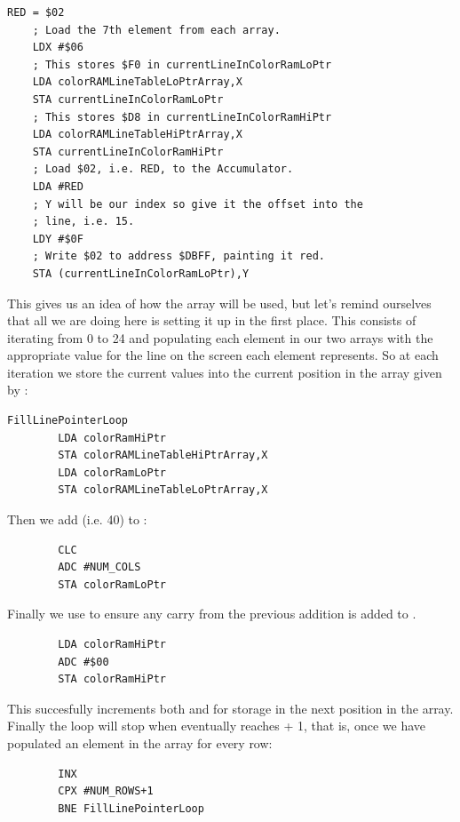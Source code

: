\begin{lstlisting}[basicstyle=\ttfamily\scriptsize]
    RED = $02
    ; Load the 7th element from each array.
    LDX #$06
    ; This stores $F0 in currentLineInColorRamLoPtr
    LDA colorRAMLineTableLoPtrArray,X
    STA currentLineInColorRamLoPtr
    ; This stores $D8 in currentLineInColorRamHiPtr
    LDA colorRAMLineTableHiPtrArray,X
    STA currentLineInColorRamHiPtr
    ; Load $02, i.e. RED, to the Accumulator. 
    LDA #RED
    ; Y will be our index so give it the offset into the
    ; line, i.e. 15. 
    LDY #$0F
    ; Write $02 to address $DBFF, painting it red.
    STA (currentLineInColorRamLoPtr),Y
\end{lstlisting}

This gives us an idea of how the array will be used, but let's remind ourselves that all we are doing here is setting
it up in the first place. This consists of iterating from 0 to 24 and populating each element in our two arrays with
the appropriate value for the line on the screen each element represents. So at each iteration we store
the current values into the current position in the array given by :

\begin{lstlisting}
FillLinePointerLoop
        LDA colorRamHiPtr
        STA colorRAMLineTableHiPtrArray,X
        LDA colorRamLoPtr
        STA colorRAMLineTableLoPtrArray,X
\end{lstlisting}

Then we add   (i.e. 40) to : 

\begin{lstlisting}
        CLC 
        ADC #NUM_COLS
        STA colorRamLoPtr
\end{lstlisting}

Finally we use  to ensure any carry from the previous addition is added to . 

\begin{lstlisting}
        LDA colorRamHiPtr
        ADC #$00
        STA colorRamHiPtr
\end{lstlisting}

This succesfully increments both  and  for storage in the next position in
the array. Finally the loop will stop when  eventually reaches  + 1, that is, once we have
populated an element in the array for every row:

\begin{lstlisting}
        INX 
        CPX #NUM_ROWS+1
        BNE FillLinePointerLoop
\end{lstlisting}
%

